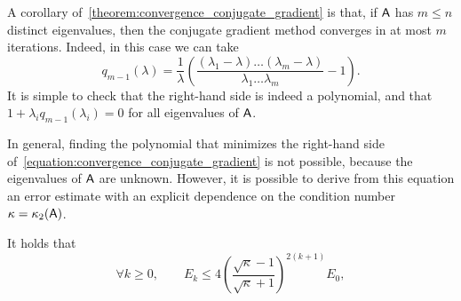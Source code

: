 A corollary of~\cref{theorem:convergence_conjugate_gradient} is that,
if $\mathsf A$ has $m \leq n$ distinct eigenvalues,
then the conjugate gradient method converges in at most $m$ iterations.
Indeed, in this case we can take
\[
    q_{m-1}(\lambda) = \frac{1}{\lambda} \left( \frac{(\lambda_1 - \lambda) \dotsc (\lambda_m - \lambda)}{\lambda_1 \dotsc \lambda_m} - 1 \right).
\]
It is simple to check that the right-hand side is indeed a polynomial,
and that $1 + \lambda_i  q_{m-1}(\lambda_i) = 0$ for all eigenvalues of $\mathsf A$.

In general, finding the polynomial that minimizes the right-hand side of~\eqref{equation:convergence_conjugate_gradient} is not possible,
because the eigenvalues of $\mathsf A$ are unknown.
However, it is possible to derive from this equation an error estimate with an explicit dependence on the condition number~$\kappa = \kappa_2(\mathsf A)$.
\begin{theorem}
    It holds that
    \[
        \forall k \geq 0, \qquad
        E_{k} \leq  4 \left( \frac{\sqrt{\kappa} - 1}{\sqrt{\kappa} + 1} \right)^{2(k+1)} E_0,
    \]
\end{theorem}
